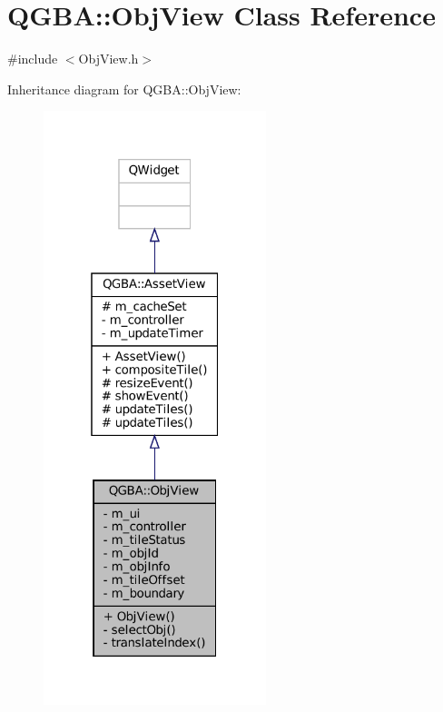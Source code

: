 \hypertarget{class_q_g_b_a_1_1_obj_view}{}\section{Q\+G\+BA\+:\+:Obj\+View Class Reference}
\label{class_q_g_b_a_1_1_obj_view}


{\ttfamily \#include $<$Obj\+View.\+h$>$}



Inheritance diagram for Q\+G\+BA\+:\+:Obj\+View\+:
\nopagebreak
\begin{figure}[H]
\begin{center}
\leavevmode
\includegraphics[width=184pt]{class_q_g_b_a_1_1_obj_view__inherit__graph}
\end{center}
\end{figure}


